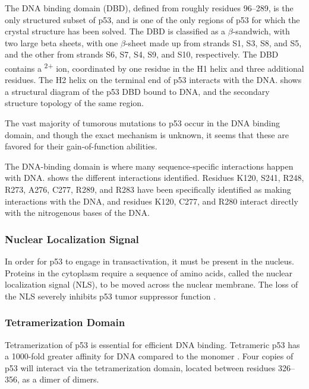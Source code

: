 The DNA binding domain (DBD), defined from roughly residues \numrange{96}{289}, is the only structured subset of p53, and is one of the only regions of p53 for which the crystal structure has been solved. The DBD is classified as a \(\beta\)-sandwich, with two large beta sheets, with one \(\beta\)-sheet made up from strands S1, S3, S8, and S5, and the other from strands S6, S7, S4, S9, and S10, respectively. The DBD contains a \textsuperscript{2+} ion, coordinated by one residue in the H1 helix and three additional residues. The H2 helix on the terminal end of p53 interacts with the DNA.  shows a structural diagram of the p53 DBD bound to DNA, and the secondary structure topology of the same region.

The vast majority of tumorous mutations to p53 occur in the DNA binding domain, and though the exact mechanism is unknown, it seems that these are favored for their gain-of-function abilities.

The DNA-binding domain is where many sequence-specific interactions happen with DNA.  shows the different interactions identified. Residues K120, S241, R248, R273, A276, C277, R289, and R283 have been specifically identified as making interactions with the DNA, and residues K120, C277, and R280 interact directly with the nitrogenous bases of the DNA.

\subsubsection{Nuclear Localization Signal}

In order for p53 to engage in transactivation, it must be present in the nucleus. Proteins in the cytoplasm require a sequence of amino acids, called the nuclear localization signal (NLS), to be moved across the nuclear membrane. The loss of the NLS severely inhibits p53 tumor suppressor function \parencite{liP53TransportedNucleus2011}.

\subsubsection{Tetramerization Domain}

Tetramerization of p53 is essential for efficient DNA binding. Tetrameric p53 has a \num{1000}-fold greater affinity for DNA compared to the monomer \parencite{weinberg2004cooperative}. Four copies of p53 will interact via the tetramerization domain, located between residues \numrange{326}{356}, as a dimer of dimers.

